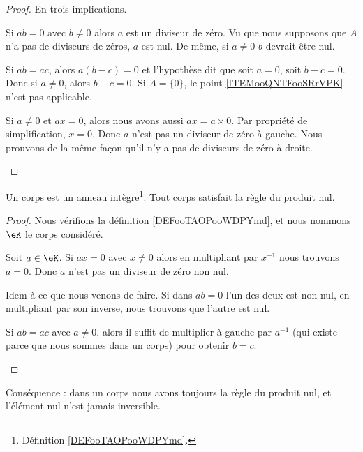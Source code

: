 \begin{proof}
	En trois implications.
	\begin{subproof}

		Si \( ab=0\) avec \( b\neq 0\) alors \( a\) est un diviseur de zéro. Vu que nous supposons que \( A\) n'a pas de diviseurs de zéros, \( a\) est nul. De même, si \( a\neq 0\) \( b\) devrait être nul.

		Si \( ab=ac\), alors \( a(b-c)=0\) et l'hypothèse dit que soit \( a=0\), soit \( b-c=0\). Donc si \( a\neq 0\), alors \( b-c=0\).
		Si \( A=\{ 0 \}\), le point \ref{ITEMooQNTFooSRrVPK} n'est pas applicable.

		Si \( a\neq 0\) et \( ax=0\), alors nous avons aussi \( ax=a\times 0\). Par propriété de simplification, \( x=0\). Donc \( a\) n'est pas un diviseur de zéro à gauche. Nous prouvons de la même façon qu'il n'y a pas de diviseurs de zéro à droite.
	\end{subproof}
\end{proof}

\begin{lemma}		\label{LEMooIKNMooMfvQnu}
	Un corps est un anneau intègre\footnote{Définition \ref{DEFooTAOPooWDPYmd}.}. Tout corps satisfait la règle du produit nul.
\end{lemma}

\begin{proof}
	Nous vérifions la définition \ref{DEFooTAOPooWDPYmd}, et nous nommons \( \eK\) le corps considéré.
	\begin{subproof}
		\spitem[Pour \ref{ITEMooMXMKooXMYpkN}]
		Soit \( a\in \eK\). Si \( ax=0\) avec \( x\neq 0\) alors en multipliant par \( x^{-1}\) nous trouvons \( a=0\). Donc \( a\) n'est pas un diviseur de zéro non nul.

		\spitem[Pour \ref{ITEMooLAJCooFwxXrV}]
		Idem à ce que nous venons de faire. Si dans \( ab=0\) l'un des deux est non nul, en multipliant par son inverse, nous trouvons que l'autre est nul.

		\spitem[Pour \ref{ITEMooQNTFooSRrVPK}]
		Si \( ab=ac\) avec \( a\neq 0\), alors il suffit de multiplier à gauche par \( a^{-1}\) (qui existe parce que nous sommes dans un corps) pour obtenir \( b=c\).
	\end{subproof}
\end{proof}
Conséquence : dans un corps nous avons toujours la règle du produit nul, et l'élément nul n'est jamais inversible.


